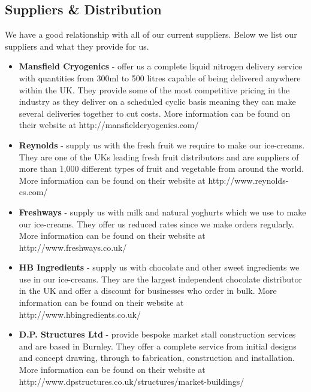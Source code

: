 \documentclass{article}
\begin{document}
  \subsection{Suppliers \& Distribution}

  We have a good relationship with all of our current suppliers. Below we list our suppliers and what they provide for us.

  \begin{itemize}
  \item {\bf Mansfield Cryogenics} - offer us a complete liquid nitrogen delivery service with quantities from 300ml to 500 litres capable of being delivered anywhere within the UK. They provide some of the most competitive pricing in the industry as they deliver on a scheduled cyclic basis meaning they can make several deliveries together to cut costs. More information can be found on their website at http://mansfieldcryogenics.com/

  \item {\bf Reynolds} - supply us with the fresh fruit we require to make our ice-creams. They are one of the UKs leading fresh fruit distributors and are suppliers of more than 1,000 different types of fruit and vegetable from around the world. More information can be found on their website at http://www.reynolds-cs.com/

  \item {\bf Freshways} - supply us with milk and natural yoghurts which we use to make our ice-creams. They offer us reduced rates since we make orders regularly. More information can be found on their website at http://www.freshways.co.uk/

  \item {\bf HB Ingredients} - supply us with chocolate and other sweet ingredients we use in our ice-creams. They are the largest independent chocolate distributor in the UK and offer a discount for businesses who order in bulk. More information can be found on their website at http://www.hbingredients.co.uk/

  \item {\bf D.P. Structures Ltd} - provide bespoke market stall construction services and are based in Burnley. They offer a complete service from initial designs and concept drawing, through to fabrication, construction and installation. More information can be found on their website at\\
   http://www.dpstructures.co.uk/structures/market-buildings/

\end{itemize}
\end{document}
